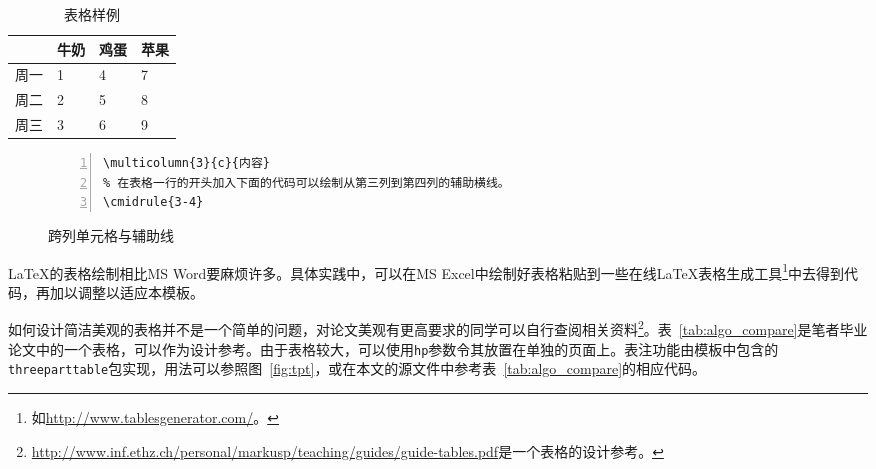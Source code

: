 \begin{table}[h!]
  \centering
  \caption{表格样例}
  \label{tab:table1}
  \begin{tabularx}{\textwidth}{XXXX}
  \toprule
        & 牛奶 & 鸡蛋 & 苹果 \\
  \midrule
   周一 &    1 &    4 &    7 \\
   周二 &    2 &    5 &    8 \\
   周三 &    3 &    6 &    9 \\
   \bottomrule
  \end{tabularx}
\end{table}


\begin{figure}[h]
  {
  \fontsize{10pt}{12pt}\selectfont
  \setmainfont{Courier New}
  \begin{lstlisting}[showstringspaces=false,numbers=left,xleftmargin=3em]
% 以下面这一行代码作为单元格的内容会使得该单元格跨越三列并居中。
\multicolumn{3}{c}{内容}
% 在表格一行的开头加入下面的代码可以绘制从第三列到第四列的辅助横线。
\cmidrule{3-4}
  \end{lstlisting}
  }
\caption{跨列单元格与辅助线}
\label{fig:multirow}
\end{figure}

\LaTeX 的表格绘制相比MS Word要麻烦许多。具体实践中，可以在MS Excel中绘制好表格粘贴到一些在线\LaTeX 表格生成工具\footnote{如\url{http://www.tablesgenerator.com/}。}中去得到代码，再加以调整以适应本模板。

如何设计简洁美观的表格并不是一个简单的问题，对论文美观有更高要求的同学可以自行查阅相关资料\footnote{\url{http://www.inf.ethz.ch/personal/markusp/teaching/guides/guide-tables.pdf}是一个表格的设计参考。}。表~\ref{tab:algo_compare}是笔者毕业论文中的一个表格，可以作为设计参考。由于表格较大，可以使用\texttt{hp}参数令其放置在单独的页面上。表注功能由模板中包含的\texttt{threeparttable}包实现，用法可以参照图~\ref{fig:tpt}，或在本文的源文件中参考表~\ref{tab:algo_compare}的相应代码。

